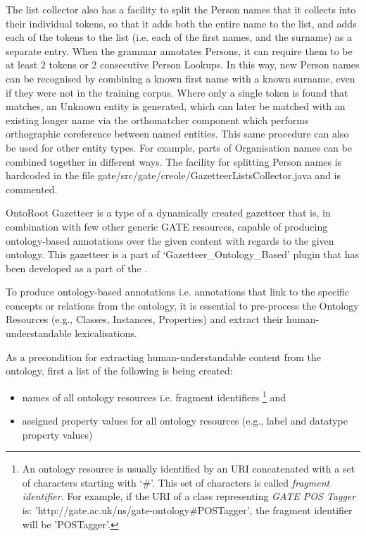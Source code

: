The list collector also has a facility to split the Person names that it
collects into their individual tokens, so that it adds both the entire name to
the list, and adds each of the tokens to the list (i.e. each of the first names,
and the surname) as a separate entry. When the grammar annotates Persons, it can
require them to be at least 2 tokens or 2 consecutive Person Lookups. In this
way, new Person names can be recognised by combining a known first name with a
known surname, even if they were not in the training corpus. Where only a single
token is found that matches, an Unknown entity is generated, which can later be
matched with an existing longer name via the orthomatcher component which
performs orthographic coreference between named entities. This same procedure
can also be used for other entity types. For example, parts of Organisation
names can be combined together in different ways. The facility for splitting
Person names is hardcoded in the file
gate/src/gate/creole/GazetteerListsCollector.java and is commented.

OntoRoot Gazetteer is a type of a dynamically created gazetteer that
is, in combination with few other generic GATE resources, capable of
producing ontology-based annotations over the given content with
regards to the given ontology. This gazetteer is a part of
`Gazetteer\_Ontology\_Based' plugin that has been developed as a part
of the .


To produce ontology-based annotations i.e. annotations that link to the specific
concepts or relations from the ontology, it is essential to pre-process the
Ontology Resources (e.g., Classes, Instances, Properties) and extract their
human-understandable lexicalisations.

As a precondition for extracting human-understandable content from the ontology,
first a list of the following is being created:
\begin{itemize}
\item names of all ontology resources i.e. fragment identifiers
\footnote{An ontology resource is usually
identified by an URI concatenated with a set of characters starting with `\#'.
This
set of characters is called \emph{fragment identifier}. For example, if the URI
of a class representing \emph{GATE POS Tagger} is:
'http://gate.ac.uk/ns/gate-ontology\#POSTagger', the fragment identifier will be
'POSTagger'.}
 and
\item assigned property values for all ontology resources (e.g., label and
datatype property values)
\end{itemize}

